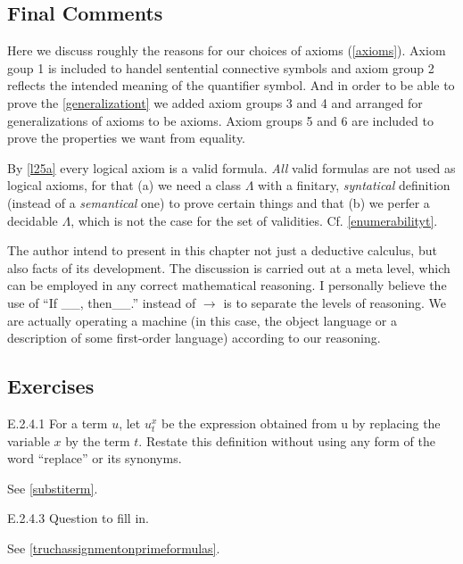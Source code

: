 \subsection*{Final Comments}\label{subsec:final}

Here we discuss roughly the reasons for our choices of axioms (\ref{axioms}). Axiom goup 1 is included to handel sentential connective symbols and axiom group 2 reflects the intended meaning of the quantifier symbol. And in order to be able to prove the \ref{generalizationt} we added axiom groups 3 and 4 and arranged for generalizations of axioms to be axioms. Axiom groups 5 and 6 are included to prove the properties we want from equality.

By \ref{l25a} every logical axiom is a valid formula. \textit{All} valid formulas are not used as logical axioms, for that (a) we need a class $\Lambda$ with a finitary, \textit{syntatical} definition (instead of a \textit{semantical} one) to prove certain things and that (b) we perfer a decidable $\Lambda$, which is not the case for the set of validities. Cf. \ref{enumerabilityt}.

The author intend to present in this chapter not just a deductive calculus, but also facts of its development. The discussion is carried out at a meta level, which can be employed in any correct mathematical reasoning. I personally believe the use of ``If \_\_, then\_\_.'' instead of $\rightarrow$ is to separate the levels of reasoning. We are actually operating a machine (in this case, the object language or a description of some first-order language) according to our reasoning.

\subsection*{Exercises}

\begin{exercise}{E.2.4.1}
  For a term $u$, let $u_t^x$ be the expression obtained from u by replacing the variable $x$ by the term $t$. Restate this definition without using any form of the word “replace” or its synonyms.
\end{exercise}

See \ref{substiterm}.

\setcounter{exercise}{2}

\begin{exercise}{E.2.4.3}
  Question to fill in.
\end{exercise}

See \ref{truchassignmentonprimeformulas}.

